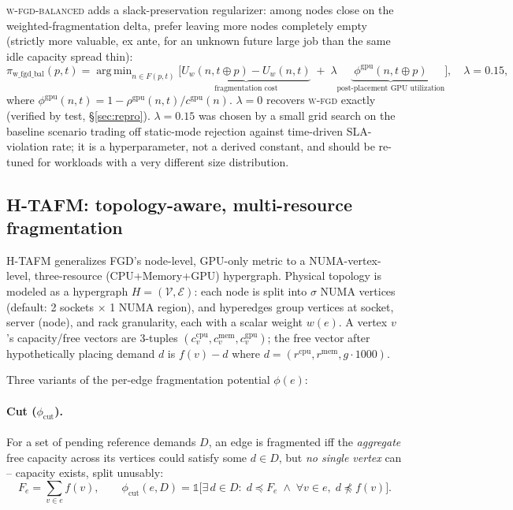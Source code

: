 \documentclass[11pt]{article}
\newcommand{\E}{\mathcal{E}}
\newcommand{\V}{\mathcal{V}}
\DeclareMathOperator*{\argmin}{arg\,min}
\begin{document}
\textsc{w-fgd-balanced} adds a slack-preservation regularizer: among
nodes close on the weighted-fragmentation delta, prefer leaving more nodes
completely empty (strictly more valuable, ex ante, for an unknown future
large job than the same idle capacity spread thin):
\[
  \pi_{\text{w\_fgd\_bal}}(p,t) = \argmin_{n \in F(p,t)}
  \Big[\underbrace{U_w(n,t\oplus p) - U_w(n,t)}_{\text{fragmentation cost}}
  \;+\; \lambda \underbrace{\;\phi^{\text{gpu}}(n, t\oplus p)\;}_{\text{post-placement GPU utilization}}\Big],
  \quad \lambda = 0.15,
\]
where $\phi^{\text{gpu}}(n,t) = 1 - \rho^{\text{gpu}}(n,t)/c^{\text{gpu}}(n)$.
$\lambda=0$ recovers \textsc{w-fgd} exactly (verified by test, \S\ref{sec:repro}).
$\lambda=0.15$ was chosen by a small grid search on the baseline scenario
trading off static-mode rejection against time-driven SLA-violation rate;
it is a hyperparameter, not a derived constant, and should be re-tuned for
workloads with a very different size distribution.

\subsection{H-TAFM: topology-aware, multi-resource fragmentation}
\label{sec:htafm}
H-TAFM \cite{fgd,defrag,hypergraph_survey,partitioning_hard,binpacking_survey}
generalizes FGD's node-level, GPU-only metric to a NUMA-vertex-level,
three-resource (CPU+Memory+GPU) hypergraph. Physical topology is modeled as
a hypergraph $H=(\V,\E)$: each node is split into $\sigma$ NUMA vertices
(default: 2 sockets $\times$ 1 NUMA region), and hyperedges group vertices
at socket, server (node), and rack granularity, each with a scalar weight
$w(e)$. A vertex $v$'s capacity/free vectors are 3-tuples
$(c^{\text{cpu}}_v, c^{\text{mem}}_v, c^{\text{gpu}}_v)$; the free vector
after hypothetically placing demand $d$ is $f(v) - d$ where $d =
(r^{\text{cpu}}, r^{\text{mem}}, g\cdot 1000)$.

Three variants of the per-edge fragmentation potential $\phi(e)$:

\paragraph{Cut ($\phi_{\text{cut}}$).} For a set of pending reference
demands $D$, an edge is fragmented iff the \emph{aggregate} free capacity
across its vertices could satisfy some $d \in D$, but \emph{no single
vertex} can -- capacity exists, split unusably:
\[
  F_e = \sum_{v \in e} f(v), \qquad
  \phi_{\text{cut}}(e, D) = \mathbb{1}\Big[\exists\, d \in D:\; d \preceq F_e \;\wedge\; \forall v \in e,\; d \not\preceq f(v)\Big].
\]
\end{document}
